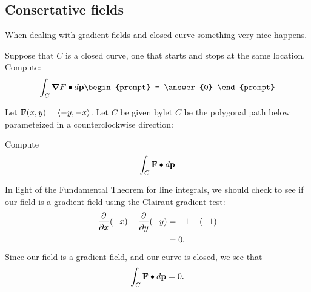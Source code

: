 \documentclass{ximera}
\begin{document}
\subsection{Consertative fields}

When dealing with gradient fields and closed curve something very nice
happens.


\begin{question}
  Suppose that $C$ is a closed curve, one that starts and stops at the
  same location. Compute:
  \[
  \int_C \grad F\dotp \d \vec{p}
  \begin{prompt}
    = \answer{0}
  \end{prompt}
  \]
\end{question}

\begin{example}
  Let $\mathbf{F}(x,y) = \left\langle -y,-x\right\rangle$. Let $C$ be given bylet $C$ be
  the polygonal path below parameteized in a counterclockwise
  direction:
  \begin{image}
  \end{image}
  Compute
  \[
  \int_C \mathbf{F}\bullet d\mathbf{p}
  \]
  \begin{explanation}
    In light of the Fundamental Theorem for line integrals, we should
    check to see if our field is a gradient field using the Clairaut
    gradient test:
    \begin{align*}
      \frac{\partial }{\partial x}(-x)-\frac{\partial }{\partial y}(-y) &= -1-(-1)\\
      &= 0.
    \end{align*}
    Since our field is a gradient field, and our curve is closed, we
    see that
    \[
    \int_C \mathbf{F}\bullet d\mathbf{p} = 0.
    \]
  \end{explanation}
\end{example}
\end{document}
